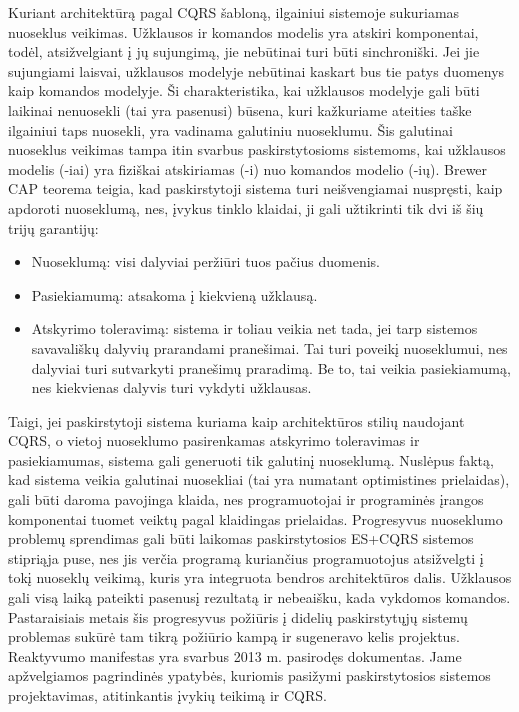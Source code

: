 Kuriant architektūrą pagal CQRS šabloną, ilgainiui sistemoje sukuriamas nuoseklus veikimas. Užklausos ir komandos modelis yra atskiri komponentai, todėl, atsižvelgiant į jų sujungimą, jie nebūtinai turi būti sinchroniški. Jei jie sujungiami laisvai, užklausos modelyje nebūtinai kaskart bus tie patys duomenys kaip komandos modelyje. Ši charakteristika, kai užklausos modelyje gali būti laikinai nenuosekli (tai yra pasenusi) būsena, kuri kažkuriame ateities taške ilgainiui taps nuosekli, yra vadinama galutiniu nuoseklumu. Šis galutinai nuoseklus veikimas tampa itin svarbus paskirstytosioms sistemoms, kai užklausos modelis (-iai) yra fiziškai atskiriamas (-i) nuo komandos modelio (-ių). Brewer CAP teorema \cite{Fox:1999:HYS:822076.822436} teigia, kad paskirstytoji sistema turi neišvengiamai nuspręsti, kaip apdoroti nuoseklumą, nes, įvykus tinklo klaidai, ji gali užtikrinti tik dvi iš šių trijų garantijų:

\begin{itemize}
  \item Nuoseklumą: visi dalyviai peržiūri tuos pačius duomenis.
  \item Pasiekiamumą: atsakoma į kiekvieną užklausą.
  \item Atskyrimo toleravimą: sistema ir toliau veikia net tada, jei tarp sistemos savavališkų dalyvių prarandami pranešimai. Tai turi poveikį nuoseklumui, nes dalyviai turi sutvarkyti pranešimų praradimą. Be to, tai veikia pasiekiamumą, nes kiekvienas dalyvis turi vykdyti užklausas.
\end{itemize}

Taigi, jei paskirstytoji sistema kuriama kaip architektūros stilių naudojant CQRS, o vietoj nuoseklumo pasirenkamas atskyrimo toleravimas ir pasiekiamumas, sistema gali generuoti tik galutinį nuoseklumą. Nuslėpus faktą, kad sistema veikia galutinai nuosekliai (tai yra numatant optimistines prielaidas), gali būti daroma pavojinga klaida, nes programuotojai ir programinės įrangos komponentai tuomet veiktų pagal klaidingas prielaidas. Progresyvus nuoseklumo problemų sprendimas gali būti laikomas paskirstytosios ES+CQRS sistemos stipriąja puse, nes jis verčia programą kuriančius programuotojus atsižvelgti į tokį nuoseklų veikimą, kuris yra integruota bendros architektūros dalis. Užklausos gali visą laiką pateikti pasenusį rezultatą ir nebeaišku, kada vykdomos komandos. Pastaraisiais metais šis progresyvus požiūris į didelių paskirstytųjų sistemų problemas sukūrė tam tikrą požiūrio kampą ir sugeneravo kelis projektus. Reaktyvumo manifestas \cite{ReactiveManifesto} yra svarbus 2013 m. pasirodęs dokumentas. Jame apžvelgiamos pagrindinės ypatybės, kuriomis pasižymi paskirstytosios sistemos projektavimas, atitinkantis įvykių teikimą ir CQRS.

